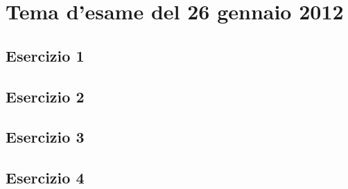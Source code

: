 \documentclass[11pt,a4paper,oneside]{article}
\begin{document}
\section*{Tema d'esame del 26 gennaio 2012}
\subsection*{Esercizio 1}
\subsection*{Esercizio 2}
\subsection*{Esercizio 3}
\subsection*{Esercizio 4}
\pagebreak
\end{document}
